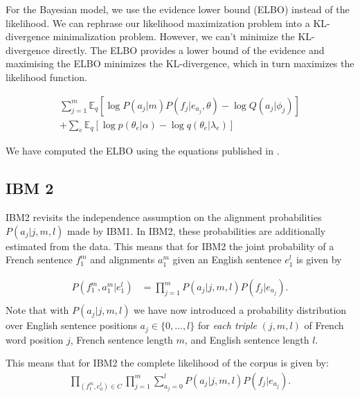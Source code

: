 \documentclass[11pt,a4paper]{article}
\begin{document}

For the Bayesian model, we use the evidence lower bound (ELBO) instead of the likelihood. We can rephrase our likelihood maximization problem into a KL-divergence minimalization problem. However, we can't minimize the KL-divergence directly. The ELBO provides a lower bound of the evidence and maximising the ELBO minimizes the KL-divergence, which in turn maximizes the likelihood function.

\begin{align*}
    \sum_{j = 1}^m \mathbb{E}_q [ \log P(a_j | m) P(f_j | e_{a_j}, \theta) - \log Q(a_j | \phi_j)] \\
    + \sum_e \mathbb{E}_q [ \log p(\theta_e | \alpha) - \log q(\theta_e | \lambda_e)]
\end{align*}

We have computed the ELBO using the equations published in \citet{schulz2}.

\subsection{IBM 2}

IBM2 revisits the independence assumption on the alignment probabilities $P(a_j|j, m, l)$ made by IBM1. In IBM2, these probabilities are additionally estimated from the data. This means that for IBM2 the joint probability of a French sentence $f_1^m$ and alignments $a_1^m$ given an English sentence 
$e_1^l$ is given by

\begin{align*}
    P(f_1^m, a_1^m|e_1^l) &= \prod^m_{j=1}P(a_j|j, m, l) P(f_j | e_{a_j}). \\
\end{align*}
Note that with $P(a_j|j, m, l)$ we have now introduced a probability distribution over English sentence positions $a_j \in \{0,\dots,l\}$ for \textit{each triple} $(j,m,l)$ of French word position $j$, French sentence length $m$, and English sentence length $l$. 

This means that for IBM2 the complete likelihood of the corpus is given by:
\begin{align}
    \prod_{(f_1^m,e_0^l)\in C}\prod_{j=1}^m  \sum_{a_j=0}^lP(a_j|j, m, l)  P(f_j | e_{a_j}).
\end{align}


\end{document}
